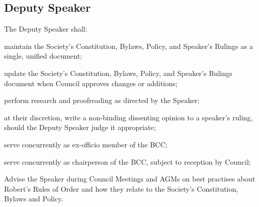 \subsection{Deputy Speaker}
\begin{longenum}[ label*=\thesubsection.\arabic*., align=left]
	\item The Deputy Speaker shall: 
    \begin{longenum}[ label*=\arabic*., align=left]
\item maintain the Society's Constitution, Bylaws, Policy, and Speaker's Rulings as a single, unified document;
\item update the Society's Constitution, Bylaws, Policy, and Speaker's Rulings document when Council approves changes or additions;
\item perform research and proofreading as directed by the Speaker;
\item at their discretion, write a non-binding dissenting opinion to a speaker's ruling, should the Deputy Speaker judge it appropriate;
\item serve concurrently as ex-officio member of the BCC;
\item serve concurrently as chairperson of the BCC, subject to reception by Council;
\item Advise the Speaker during Council Meetings and AGMs on best practises about Robert's Rules of Order and how they relate to the Society's Constitution, Bylaws and Policy.
\end{longenum}
\end{longenum}

\newpage


